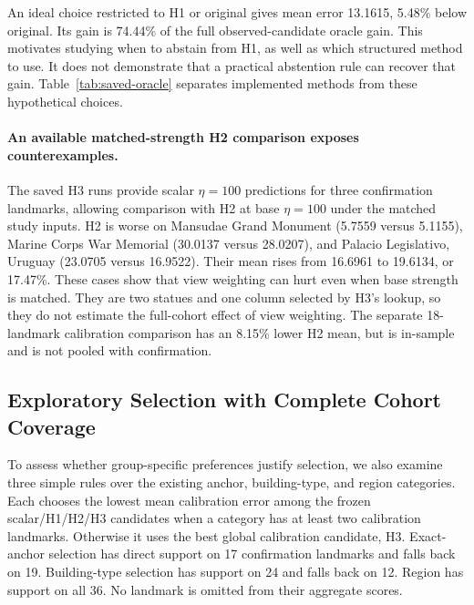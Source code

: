 An ideal choice restricted to H1 or original gives mean error 13.1615, 5.48\% below original. Its gain is 74.44\% of the full observed-candidate oracle gain. This motivates studying when to abstain from H1, as well as which structured method to use. It does not demonstrate that a practical abstention rule can recover that gain. Table~\ref{tab:saved-oracle} separates implemented methods from these hypothetical choices.

\begin{center}
\begin{minipage}{\columnwidth}
\label{tab:saved-oracle}
\centering
\small

\end{minipage}
\end{center}

\paragraph{An available matched-strength H2 comparison exposes counterexamples.}
The saved H3 runs provide scalar $\eta=100$ predictions for three confirmation landmarks, allowing comparison with H2 at base $\eta=100$ under the matched study inputs. H2 is worse on Mansudae Grand Monument (5.7559 versus 5.1155), Marine Corps War Memorial (30.0137 versus 28.0207), and Palacio Legislativo, Uruguay (23.0705 versus 16.9522). Their mean rises from 16.6961 to 19.6134, or 17.47\%. These cases show that view weighting can hurt even when base strength is matched. They are two statues and one column selected by H3's lookup, so they do not estimate the full-cohort effect of view weighting. The separate 18-landmark calibration comparison has an 8.15\% lower H2 mean, but is in-sample and is not pooled with confirmation.

\subsection{Exploratory Selection with Complete Cohort Coverage}
\label{sec:complete-selection}
To assess whether group-specific preferences justify selection, we also examine three simple rules over the existing anchor, building-type, and region categories. Each chooses the lowest mean calibration error among the frozen scalar/H1/H2/H3 candidates when a category has at least two calibration landmarks. Otherwise it uses the best global calibration candidate, H3. Exact-anchor selection has direct support on 17 confirmation landmarks and falls back on 19. Building-type selection has support on 24 and falls back on 12. Region has support on all 36. No landmark is omitted from their aggregate scores.

